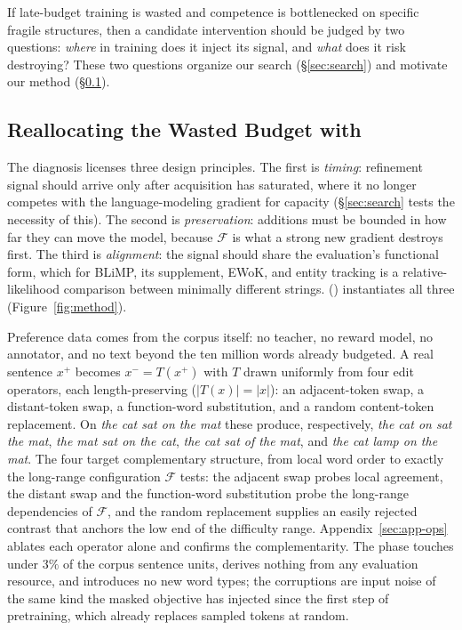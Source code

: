 If late-budget training is wasted and competence is bottlenecked on specific
fragile structures, then a candidate
intervention should be judged by two questions: \emph{where} in training does it
inject its signal, and \emph{what} does it risk destroying? These two questions
organize our search (\S\ref{sec:search}) and motivate our method
(\S\ref{sec:method}).



\subsection{Reallocating the Wasted Budget with \MPO{}}
\label{sec:method}


The diagnosis licenses three design principles. The first is \emph{timing}:
refinement signal should arrive only after acquisition has saturated, where
it no longer competes with the language-modeling gradient for capacity
(\S\ref{sec:search} tests the necessity of this). The second is
\emph{preservation}: additions must be bounded in how far they can move the
model, because $\mathcal{F}$ is what a strong new gradient destroys first.
The third is \emph{alignment}: the signal should share the evaluation's
functional form, which for BLiMP, its supplement, EWoK, and entity tracking
is a relative-likelihood comparison between minimally different strings.
\MPOlong{} (\MPO{}) instantiates all three (Figure~\ref{fig:method}).

Preference data comes from the corpus itself: no teacher, no reward model,
no annotator, and no text beyond the ten million words already budgeted. A
real sentence $x^{+}$ becomes $x^{-} = T(x^{+})$ with $T$ drawn uniformly
from four edit operators, each length-preserving ($|T(x)| = |x|$): an
adjacent-token swap, a distant-token swap, a function-word substitution, and a
random content-token replacement. On \emph{the cat sat on the mat} these
produce, respectively, \emph{the cat on sat the mat}, \emph{the mat sat on
the cat}, \emph{the cat sat of the mat}, and \emph{the cat lamp on the
mat}. The four target complementary structure,
from local word order to exactly the long-range configuration $\mathcal{F}$
tests: the adjacent swap probes local agreement, the distant swap and the
function-word substitution probe the long-range dependencies of
$\mathcal{F}$, and the random replacement supplies an easily rejected
contrast that anchors the low end of the difficulty range.
Appendix~\ref{sec:app-ops} ablates each operator alone and confirms the
complementarity. The phase touches under $3\%$ of the \rSentBank{} corpus sentence
units, derives nothing from any evaluation resource, and introduces no new
word types; the corruptions are input noise of the same kind the masked
objective has injected since the first step of pretraining, which already
replaces sampled tokens at random.

